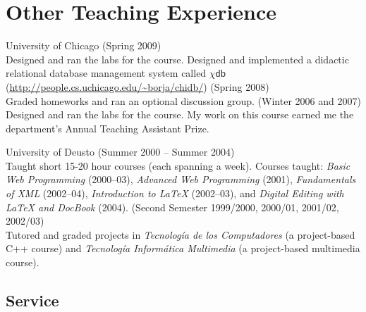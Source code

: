\documentclass{resume}
\begin{document}
\newpage

\section*{\hspace{-1cm}Other Teaching Experience}

\begin{category}{University of Chicago} 
 (Spring 2009)\\
Designed and ran the labs for the course. Designed and implemented a didactic relational database management system called $\chi\textsf{db}$ (\url{http://people.cs.uchicago.edu/~borja/chidb/})
 (Spring 2008)\\
Graded homeworks and ran an optional discussion group.
 (Winter 2006 and 2007)\\
Designed and ran the labs for the course. My work on this course earned me the department's Annual Teaching Assistant Prize.
\end{category}

\begin{category}{University of Deusto} 
 (Summer 2000 -- Summer 2004)\\
Taught short 15-20 hour courses (each spanning a week). Courses taught: \emph{Basic Web Programming} (2000--03), \emph{Advanced Web Programming} (2001), \emph{Fundamentals of XML} (2002--04), \emph{Introduction to \LaTeX} (2002--03), and \emph{Digital Editing with \LaTeX{} and DocBook} (2004).
 (Second Semester 1999/2000, 2000/01, 2001/02, 2002/03)\\
Tutored and graded projects in \emph{Tecnología de los Computadores} (a project-based C++ course) and \emph{Tecnología Informática Multimedia} (a project-based multimedia course).
\end{category}


\begin{center}
\section*{\huge Service}
\vspace{2ex}
\end{center}
\end{document}
